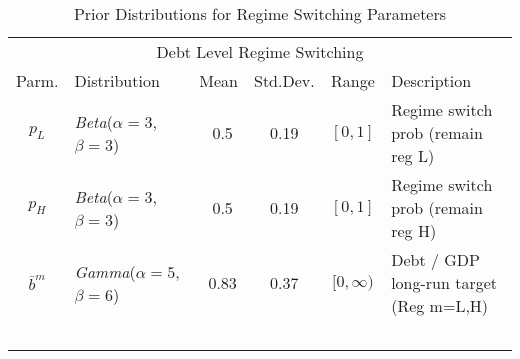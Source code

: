 \documentclass[11pt]{article}
\begin{document}
\begin{table}\caption{Prior Distributions for Regime Switching Parameters}\label{tb:sprior}
  \hspace*{-0.5in}\begin{small}
    \begin{tabular}{clcccl}
      \multicolumn{6}{c}{Debt Level Regime Switching} \\
      Parm. & Distribution & Mean & Std.Dev. & Range & Description\\ \hline
      $p_L$ & \textit{Beta}($\alpha=3$, $\beta=3$) & ~0.5 & 0.19 & $[0,1]$ & Regime switch prob (remain reg L) \\ [0.3pc]
      $p_H$ & \textit{Beta}($\alpha=3$, $\beta=3$) & ~0.5 & 0.19 & $[0,1]$ & Regime switch prob (remain reg H) \\ [0.3pc]
      $\bar{b}^m$ & \textit{Gamma}($\alpha=5$, $\beta=6$) & ~0.83 & 0.37 & $[0,\infty)$ & Debt / GDP long-run target (Reg m=L,H) \\ [0.3pc] \hline
      \ \\ [0.7pc]
        

\end{tabular}
\end{small}
\end{table}
\end{document}

